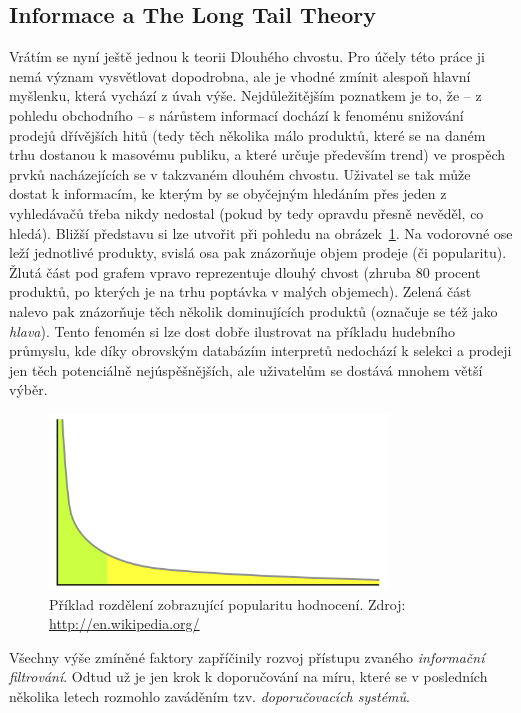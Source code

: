 \documentclass[thesis=M,czech]{FITthesis}[2014/05/07]
\begin{document}
\begin{introduction}
	\subsection{Informace a The Long Tail Theory}	
	\label{sub:ltl}
	Vrátím se nyní ještě jednou k teorii Dlouhého chvostu. Pro účely této práce ji nemá význam vysvětlovat dopodrobna, ale je vhodné zmínit alespoň hlavní myšlenku, která vychází z úvah výše. Nejdůležitějším poznatkem je to, že – z pohledu obchodního – s nárůstem informací dochází k fenoménu snižování prodejů dřívějších hitů (tedy těch několika málo produktů, které se na daném trhu dostanou k masovému publiku, a které určuje především trend) ve prospěch prvků nacházejících se v takzvaném dlouhém chvostu. Uživatel se tak může dostat k informacím, ke kterým by se obyčejným hledáním přes jeden z vyhledávačů třeba nikdy nedostal (pokud by tedy opravdu přesně nevěděl, co hledá). Bližší představu si lze utvořit při pohledu na obrázek~\ref{fig:longtail}. Na vodorovné ose leží jednotlivé produkty, svislá osa pak znázorňuje objem prodeje (či popularitu). Žlutá část pod grafem vpravo reprezentuje dlouhý chvost (zhruba 80 procent produktů, po kterých je na trhu poptávka v malých objemech). Zelená část nalevo pak znázorňuje těch několik dominujících produktů (označuje se též jako \emph{hlava}). Tento fenomén si lze dost dobře ilustrovat na příkladu hudebního průmyslu, kde díky obrovským databázím interpretů nedochází k selekci a prodeji jen těch potenciálně nejúspěšnějších, ale uživatelům se dostává mnohem větší výběr.
	
\begin{figure}\centering
	\includegraphics[width=0.8\textwidth]{obr/longtail.png}
 	\caption[Příklad rozdělení zobrazující popularitu hodnocení]{Příklad rozdělení zobrazující popularitu hodnocení. Zdroj: \url{http://en.wikipedia.org/} \cite{wiki:longtail}}\label{fig:longtail}
\end{figure}	

	Všechny výše zmíněné faktory zapříčinily rozvoj přístupu zvaného \emph{informační filtrování}. Odtud už je jen krok k doporučování na míru, které se v posledních několika letech rozmohlo zaváděním tzv. \emph{doporučovacích systémů}.


\end{introduction}
\end{document}
